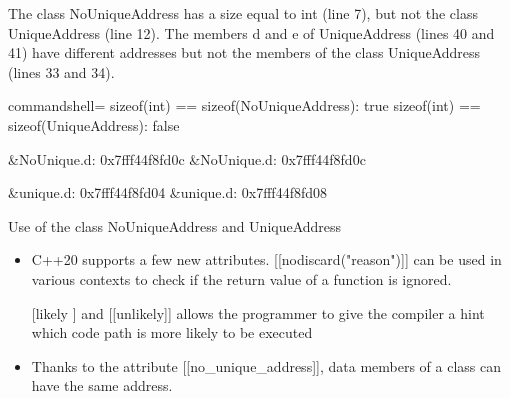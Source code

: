 The class NoUniqueAddress has a size equal to int (line 7), but not the class UniqueAddress (line 12). The members d and e of UniqueAddress (lines 40 and 41) have different addresses but not the members of the class UniqueAddress (lines 33 and 34).

\begin{tcblisting}{commandshell={}}
sizeof(int) == sizeof(NoUniqueAddress): true
sizeof(int) == sizeof(UniqueAddress): false

&NoUnique.d: 0x7fff44f8fd0c
&NoUnique.d: 0x7fff44f8fd0c

&unique.d: 0x7fff44f8fd04
&unique.d: 0x7fff44f8fd08
\end{tcblisting}

\begin{center}
Use of the class NoUniqueAddress and UniqueAddress
\end{center}


\begin{tcolorbox}[colback=mygreen!5!white,colframe=mygreen!75!black,title={Distilled Information}]
\begin{itemize}
\item 
C++20 supports a few new attributes. [[nodiscard("reason")]] can be used in various contexts to check if the return value of a function is ignored.

\item 
[[likely]] and [[unlikely]] allows the programmer to give the compiler a hint which code path is more likely to be executed
\item 
Thanks to the attribute [[no\_unique\_address]], data members of a class can have the same address.
\end{itemize}
\end{tcolorbox}


















